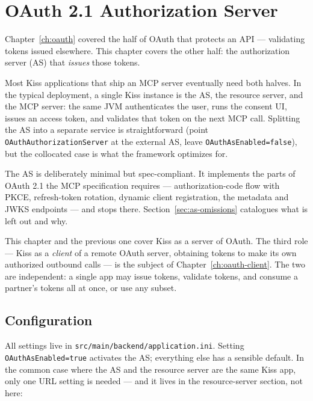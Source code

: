 \chapter{OAuth 2.1 Authorization Server}
\label{ch:oauth-as}

Chapter~\ref{ch:oauth} covered the half of OAuth that protects an API --- validating tokens issued elsewhere.  This chapter covers the other half: the authorization server (AS) that \emph{issues} those tokens.

Most Kiss applications that ship an MCP server eventually need both halves.  In the typical deployment, a single Kiss instance is the AS, the resource server, and the MCP server: the same JVM authenticates the user, runs the consent UI, issues an access token, and validates that token on the next MCP call.  Splitting the AS into a separate service is straightforward (point \texttt{OAuthAuthorizationServer} at the external AS, leave \texttt{OAuthAsEnabled=false}), but the collocated case is what the framework optimizes for.

The AS is deliberately minimal but spec-compliant.  It implements the parts of OAuth 2.1 the MCP specification requires --- authorization-code flow with PKCE, refresh-token rotation, dynamic client registration, the metadata and JWKS endpoints --- and stops there.  Section~\ref{sec:as-omissions} catalogues what is left out and why.

This chapter and the previous one cover Kiss as a server of OAuth.  The third role --- Kiss as a \emph{client} of a remote OAuth server, obtaining tokens to make its own authorized outbound calls --- is the subject of Chapter~\ref{ch:oauth-client}.  The two are independent: a single app may issue tokens, validate tokens, and consume a partner's tokens all at once, or use any subset.

\section{Configuration}
\label{sec:as-config}

All settings live in \texttt{src/main/back\-end/applic\-ation.ini}.  Setting \texttt{OAuth\-As\-Enabled=true} activates the AS; everything else has a sensible default.  In the common case where the AS and the resource server are the same Kiss app, only one URL setting is needed --- and it lives in the resource-server section, not here:

